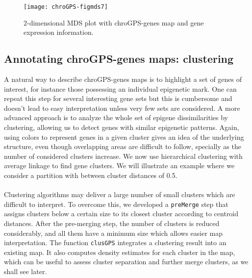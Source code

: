 \documentclass[a4paper,12pt,nogin]{article}
\newcommand{\newtext}[1]{{\color{blue} #1}} %
\begin{document}
\footnotesize
 
\begin{Schunk}
\end{Schunk}
 
\normalsize

\begin{figure}
\begin{center}
\texttt{[image: chroGPS-figmds7]}
\end{center}
\caption{2-dimensional MDS plot with chroGPS-genes map and gene expression
  information. }
\label{fig:mds7}
\end{figure}
 
 
\subsection{Annotating chroGPS-genes maps: clustering}
\label{sec:clusGPS}
 
A natural way to describe chroGPS-genes maps is to highlight a set of
genes of interest, for instance those possessing an individual
epigenetic mark. One can repeat this step for several interesting gene
sets but this is cumbersome and doesn't lead to easy interpretation
unless very few sets are considered. A more advanced approach is to
analyze the whole set of epigene dissimilarities by clustering,
allowing us to detect 
\newtext{genes with similar epigenetic patterns.}
Again, using colors to represent genes in
a given cluster gives an idea of the underlying
structure, even though overlapping areas are difficult to follow,
specially as the number of considered clusters increase. 
\newtext{We now use }
hierarchical clustering with average linkage 
to find gene clusters.
We will
illustrate an example where we consider a partition with between
cluster distances of 0.5. 
\\\\
Clustering algorithms 
may deliver a large number of small clusters 
\newtext{which are difficult to interpret.}
To overcome this, we developed a
\texttt{preMerge} step that assigns clusters below a certain size to
its closest cluster according to centroid distances. After the pre-merging step,
the number of clusters is reduced considerably, and all them have a
minimum size which allows easier map interpretation.
\newtext{The function \texttt{clusGPS} integrates a clustering result into an existing map.
It also computes density estimates for each cluster in the map, which can be useful 
to assess cluster separation and further merge clusters, as we shall see later.}
\end{document}
